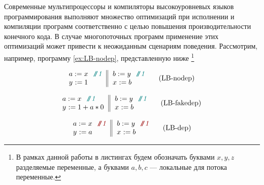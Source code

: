 
Современные мультипроцессоры и компиляторы 
высокоуровневых языков программирования
выполняют множество оптимизаций при исполнении
и компиляции программ соответственно с целью
повышения производительности конечного кода.
В случае многопоточных программ применение этих оптимизаций
может привести к неожиданным сценариям поведения.
Рассмотрим, например, программу \ref{ex:LB-nodep}, представленную ниже%
\footnote{В рамках данной работы в листингах будем обозначать
буквами $x, y, z$ разделяемые переменные,
а буквами $a, b, c$ --- локальные для потока переменные.}

\begin{center}
\begin{minipage}{.32\linewidth}
{\small
\begin{equation}
\inarrII{
  \readInst{}{a}{x} \rfcomment{1} \\
  \writeInst{}{y}{1} \\
}{\readInst{}{b}{y} \rfcomment{1} \\
  \writeInst{}{x}{b}  \\
}%
\tag{LB-nodep}\label{ex:LB-nodep}
\end{equation}
}
\end{minipage}
%
\hfill\vline\hfill
\begin{minipage}{.32\linewidth}
{\small
\begin{equation}
\inarrII{
  \readInst{}{a}{x} \rfcomment{1} \\
  \writeInst{}{y}{1 + a * 0} \\
}{\readInst{}{b}{y} \rfcomment{1} \\
  \writeInst{}{x}{b}  \\
}
\tag{LB-fakedep}\label{ex:LB-fakedep}
\end{equation}
}
\end{minipage}
%
\hfill\vline\hfill
%
\begin{minipage}{.32\linewidth}
{\small
\begin{equation}
\inarrII{
  \readInst{}{a}{x} \nocomment{1} \\
  \writeInst{}{y}{a} \\
}{\readInst{}{b}{y} \nocomment{1} \\
  \writeInst{}{x}{b}  \\
}
\tag{LB-dep}\label{ex:LB-dep}
\end{equation}
}
\end{minipage}
\end{center}

